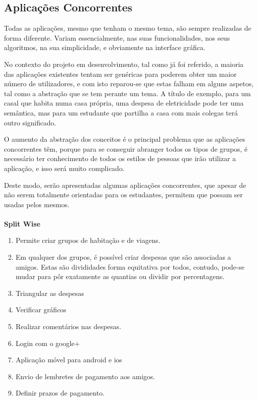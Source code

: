 \subsection{Aplicações Concorrentes}

Todas as aplicações, mesmo que tenham o mesmo tema, são sempre realizadas de forma diferente. Variam essencialmente, nas suas funcionalidades, nos seus algoritmos, na sua simplicidade, e obviamente na interface gráfica.

No contexto do projeto em desenvolvimento, tal como já foi referido, a maioria das aplicações existentes tentam ser genéricas para poderem obter um maior número de utilizadores, e com isto reparou-se que estas falham em alguns aspetos, tal como a abstração que se tem perante um tema. A título de exemplo, para um casal que habita numa casa própria, uma despesa de eletricidade pode ter uma semântica, mas para um estudante que partilha a casa com mais colegas terá outro significado.

O aumento da abstração dos conceitos é o principal problema que as aplicações concorrentes têm, porque para se conseguir abranger todos os tipos de grupos, é necessário ter conhecimento de todos os estilos de pessoas que irão utilizar a aplicação, e isso será muito complicado.

Deste modo, serão apresentadas algumas aplicações concorrentes, que apesar de não serem totalmente orientadas para os estudantes, permitem que possam ser usadas pelos mesmos.\\

\textbf{\\Split Wise}
\begin{enumerate}
\item Permite criar grupos de habitação e de viagens.
\item Em qualquer dos grupos, é possível criar despesas que são associadas a amigos. Estas são divididades forma equitativa por todos, contudo, pode-se mudar para pôr exatamente as quantias ou dividir por percentagens.
\item Triangular as despesas
\item Verificar gráficos
\item Realizar comentários nas despesas.
\item Login com o google+
\item Aplicação móvel para android e ios
\item Envio de lembretes de pagamento aos amigos.
\item Definir prazos de pagamento.
\end{enumerate}

